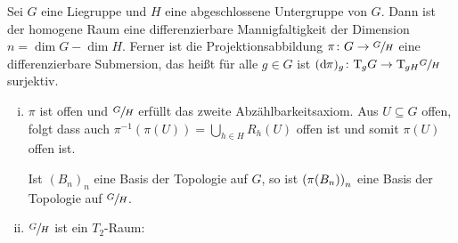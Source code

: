 \begin{satz}
	Sei $G$ eine Liegruppe und $H$ eine abgeschlossene Untergruppe von $G$.
	Dann ist der homogene Raum eine differenzierbare Mannigfaltigkeit der Dimension $n = \dim G - \dim H$.
	Ferner ist die Projektionsabbildung $\pi \colon G \to \sfrac{G}{H}$ eine differenzierbare Submersion, das heißt für alle $g \in G$ ist $(\mathd \pi)_g \colon \Tmap_g G \to \Tmap_{gH} \sfrac{G}{H}$ surjektiv.
\end{satz}
\begin{beweis}
	\begin{enumerate}[(i)]
		\item $\pi$ ist offen und $\sfrac{G}{H}$ erfüllt das zweite Abzählbarkeitsaxiom.
		Aus $U \subseteq G $ offen, folgt dass auch $\pi^{-1}(\pi(U)) = \bigcup_{h \in H} R_h(U)$ offen ist und somit $\pi(U)$ offen ist.
		
		Ist $(B_n)_n$ eine Basis der Topologie auf $G$, so ist $\enbrace*{\pi(B_n)}_n$ eine Basis der Topologie auf $\sfrac{G}{H}$.
		\item $\sfrac{G}{H}$ ist ein $T_2$-Raum:
		

\end{enumerate}
\end{beweis}
